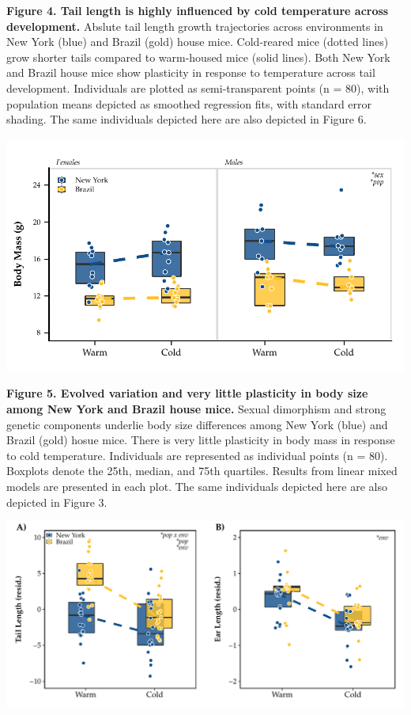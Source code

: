 \documentclass[]{article}
\begin{document}
\textbf{Figure 4. Tail length is highly influenced by cold temperature
across development.} Abslute tail length growth trajectories across
environments in New York (blue) and Brazil (gold) house mice.
Cold-reared mice (dotted lines) grow shorter tails compared to
warm-housed mice (solid lines). Both New York and Brazil house mice show
plasticity in response to temperature across tail development.
Individuals are plotted as semi-transparent points (n = 80), with
population means depicted as smoothed regression fits, with standard
error shading. The same individuals depicted here are also depicted in
Figure 6.

\newpage

\includegraphics{../results/figures/RXNs_BW.pdf}

\textbf{Figure 5. Evolved variation and very little plasticity in body
size among New York and Brazil house mice.} Sexual dimorphism and strong
genetic components underlie body size differences among New York (blue)
and Brazil (gold) hosue mice. There is very little plasticity in body
mass in response to cold temperature. Individuals are represented as
individual points (n = 80). Boxplots denote the 25th, median, and 75th
quartiles. Results from linear mixed models are presented in each plot.
The same individuals depicted here are also depicted in Figure 3.

\newpage

\includegraphics{../results/figures/RXNs_Extremities.pdf}
\end{document}

